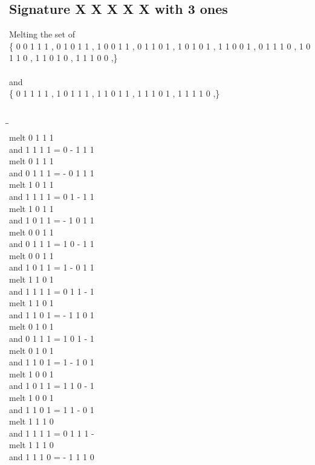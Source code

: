 \documentclass{article}
\begin{document}
\subsection{Signature X X X X X with 3 ones}
Melting the set of\\
\{ 0  0  1  1  1 , 0  1  0  1  1 , 1  0  0  1  1 , 0  1  1  0  1 , 1  0  1  0  1 , 1  1  0  0  1 , 0  1  1  1  0 , 1  0  1  1  0 , 1  1  0  1  0 , 1  1  1  0  0 ,\}\\\\
and\\
\{ 0  1  1  1  1 , 1  0  1  1  1 , 1  1  0  1  1 , 1  1  1  0  1 , 1  1  1  1  0 ,\}\\\\
\begin{tabbing}
\hspace{3cm}\=\hspace{3cm}\=\hspace{3cm}\\[1cm]
melt  0  1  1  1 \\
and  1  1  1  1 \>
 =  0  -  1  1  1 \\[1mm]
melt  0  1  1  1 \\
and  0  1  1  1 \>
 =  -  0  1  1  1 \\[1mm]
melt  1  0  1  1 \\
and  1  1  1  1 \>
 =  0  1  -  1  1 \\[1mm]
melt  1  0  1  1 \\
and  1  0  1  1 \>
 =  -  1  0  1  1 \\[1mm]
melt  0  0  1  1 \\
and  0  1  1  1 \>
 =  1  0  -  1  1 \\[1mm]
melt  0  0  1  1 \\
and  1  0  1  1 \>
 =  1  -  0  1  1 \\[1mm]
melt  1  1  0  1 \\
and  1  1  1  1 \>
 =  0  1  1  -  1 \\[1mm]
melt  1  1  0  1 \\
and  1  1  0  1 \>
 =  -  1  1  0  1 \\[1mm]
melt  0  1  0  1 \\
and  0  1  1  1 \>
 =  1  0  1  -  1 \\[1mm]
melt  0  1  0  1 \\
and  1  1  0  1 \>
 =  1  -  1  0  1 \\[1mm]
melt  1  0  0  1 \\
and  1  0  1  1 \>
 =  1  1  0  -  1 \\[1mm]
melt  1  0  0  1 \\
and  1  1  0  1 \>
 =  1  1  -  0  1 \\[1mm]
melt  1  1  1  0 \\
and  1  1  1  1 \>
 =  0  1  1  1  - \\[1mm]
melt  1  1  1  0 \\
and  1  1  1  0 \>
 =  -  1  1  1  0 \\[1mm]
\end{tabbing}
\end{document}
